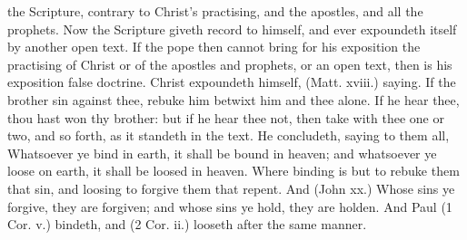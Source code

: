 \documentclass{custom}
\begin{document}
the Scripture, contrary to Christ's practising, and the 
apostles, and all the prophets. Now the Scripture giveth 
record to himself, and ever expoundeth itself by another 
open text. If the pope then cannot bring for his exposition 
the practising of Christ or of the apostles and prophets, or 
an open text, then is his exposition false doctrine. Christ 
expoundeth himself, (Matt. xviii.) saying. If the brother 
sin against thee, rebuke him betwixt him and thee alone. 
If he hear thee, thou hast won thy brother: but if he hear 
thee not, then take with thee one or two, and so forth, as 
it standeth in the text. He concludeth, saying to them all, 
Whatsoever ye bind in earth, it shall be bound in heaven; 
and whatsoever ye loose on earth, it shall be loosed in 
heaven. Where binding is but to rebuke them that sin, 
and loosing to forgive them that repent. And (John xx.) 
Whose sins ye forgive, they are forgiven; and whose sins 
ye hold, they are holden. And Paul (1 Cor. v.) bindeth, 
and (2 Cor. ii.) looseth after the same manner. 
\end{document}

